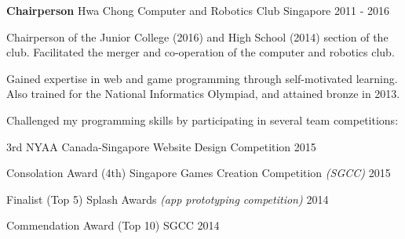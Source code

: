 \begin{cventries}


\cventry
{\textbf{Chairperson}} %
{Hwa Chong Computer and Robotics Club} %
{Singapore} %
{2011 - 2016} %
{ %
\begin{cvitems}
	\item {Chairperson of the Junior College (2016) and High School (2014) section of the club. \newline
		Facilitated the merger and co-operation of the computer and robotics club.}
	\item {Gained expertise in web and game programming through self-motivated learning. \newline
		Also trained for the National Informatics Olympiad, and attained bronze in 2013.}
	\item {Challenged my programming skills by participating in several team competitions:}
\end{cvitems}
}
\end{cventries}

\begin{cvhonors}
	
	\cvhonor
	{3rd} %
	{NYAA Canada-Singapore Website Design Competition} %
	{} %
	{2015} %
	
	
	\cvhonor
	{Consolation Award (4th)} %
	{Singapore Games Creation Competition \textit{(SGCC)} } %
	{} %
	{2015} %
	
	
	\cvhonor
	{Finalist (Top 5)} %
	{Splash Awards \textit{(app prototyping competition)}} %
	{} %
	{2014} %
	
	
	\cvhonor
	{Commendation Award (Top 10)} %
	{SGCC } %
	{} %
	{2014} %
	
\end{cvhonors}

